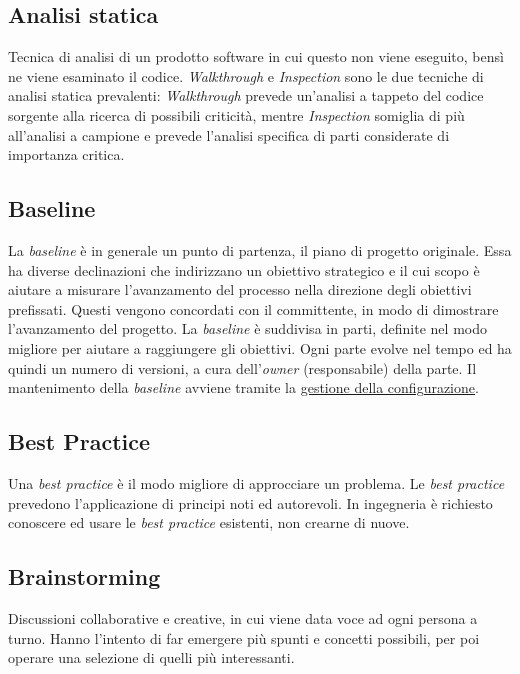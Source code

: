 	\subsection{Analisi statica}
	\label{sec:analisistatica}
	Tecnica di analisi di un prodotto software in cui questo non viene eseguito, bensì ne viene esaminato il codice.
	\emph{Walkthrough} e \emph{Inspection} sono le due tecniche di analisi statica prevalenti: \emph{Walkthrough} prevede un'analisi a tappeto del codice sorgente alla ricerca di possibili criticità, mentre \emph{Inspection} somiglia di più all'analisi a campione e prevede l'analisi specifica di parti considerate di importanza critica.
	\newpage
	\subsection{Baseline}
	\label{sec:baseline}
	La \emph{baseline} è in generale un punto di partenza, il piano di progetto originale. Essa ha diverse declinazioni che indirizzano un obiettivo strategico e il cui scopo è aiutare a misurare l'avanzamento del processo nella direzione degli obiettivi prefissati. Questi vengono concordati con il committente, in modo di dimostrare l'avanzamento del progetto. La  \emph{baseline} è suddivisa in parti, definite nel modo migliore per aiutare a raggiungere gli obiettivi. Ogni parte evolve nel tempo ed ha quindi un numero di versioni, a cura dell'\emph{owner} (responsabile) della parte. Il mantenimento della  \emph{baseline} avviene tramite la \underline{\hyperref[sec:controlloconfigurazione]{gestione della configurazione}}. 
	
	\subsection{Best Practice}
	\label{sec:bestpractice}
	Una \emph{best practice} è il modo migliore di approcciare un problema. Le \emph{best practice} prevedono l'applicazione di principi noti ed autorevoli. In ingegneria è richiesto conoscere ed usare le \emph{best practice} esistenti, non crearne di nuove.

	\subsection{Brainstorming}
	\label{sec:brainstorming}
	Discussioni collaborative e creative, in cui viene data voce ad ogni persona a turno. Hanno l'intento di far emergere più spunti e concetti possibili, per poi operare una selezione di quelli più interessanti. \newpage
	


